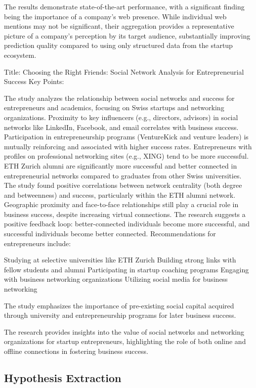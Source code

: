 \documentclass[a4paper, oneside]{discothesis}
\begin{document}
The results demonstrate state-of-the-art performance, with a significant finding being the importance of a company's web presence. While individual web mentions may not be significant, their aggregation provides a representative picture of a company's perception by its target audience, substantially improving prediction quality compared to using only structured data from the startup ecosystem.

Title: Choosing the Right Friends: Social Network Analysis for Entrepreneurial Success
Key Points:

The study analyzes the relationship between social networks and success for entrepreneurs and academics, focusing on Swiss startups and networking organizations.
Proximity to key influencers (e.g., directors, advisors) in social networks like LinkedIn, Facebook, and email correlates with business success.
Participation in entrepreneurship programs (VentureKick and venture leaders) is mutually reinforcing and associated with higher success rates.
Entrepreneurs with profiles on professional networking sites (e.g., XING) tend to be more successful.
ETH Zurich alumni are significantly more successful and better connected in entrepreneurial networks compared to graduates from other Swiss universities.
The study found positive correlations between network centrality (both degree and betweenness) and success, particularly within the ETH alumni network.
Geographic proximity and face-to-face relationships still play a crucial role in business success, despite increasing virtual connections.
The research suggests a positive feedback loop: better-connected individuals become more successful, and successful individuals become better connected.
Recommendations for entrepreneurs include:

Studying at selective universities like ETH Zurich
Building strong links with fellow students and alumni
Participating in startup coaching programs
Engaging with business networking organizations
Utilizing social media for business networking


The study emphasizes the importance of pre-existing social capital acquired through university and entrepreneurship programs for later business success.

The research provides insights into the value of social networks and networking organizations for startup entrepreneurs, highlighting the role of both online and offline connections in fostering business success.

\subsection{Hypothesis Extraction}
\end{document}
